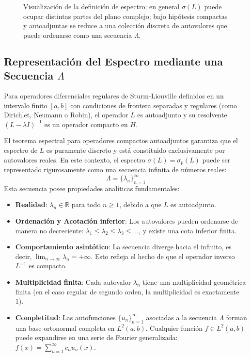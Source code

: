 \documentclass[a4paper]{article}
\begin{document}
\begin{figure}[H]
\begin{tikzpicture}[>=Latex,scale=0.9,
  box/.style={draw,rounded corners,thick,align=center,font=\small,inner sep=5pt},
  tag/.style={font=\scriptsize,align=center,fill=white,inner sep=1pt}]
\end{tikzpicture}
\caption{Visualización de la definición de espectro: en general $\sigma(L)$ puede ocupar distintas partes del plano complejo; bajo hipótesis compactas y autoadjuntas se reduce a una colección discreta de autovalores que puede ordenarse como una secuencia $\Lambda$.}
\end{figure}

\subsection*{Representación del Espectro mediante una Secuencia $\Lambda$}
Para operadores diferenciales regulares de Sturm-Liouville definidos en un intervalo finito $[a, b]$ con condiciones de frontera separadas y regulares (como Dirichlet, Neumann o Robin), el operador $L$ es autoadjunto y su resolvente $(L - \lambda I)^{-1}$ es un operador compacto en $H$. 

El teorema espectral para operadores compactos autoadjuntos garantiza que el espectro de $L$ es puramente discreto y está constituido exclusivamente por autovalores reales. En este contexto, el espectro $\sigma(L) = \sigma_p(L)$ puede ser representado rigurosamente como una secuencia infinita de números reales:
$$ \Lambda = \{\lambda_n\}_{n=1}^{\infty} $$
Esta secuencia posee propiedades analíticas fundamentales:
\begin{itemize}
    \item \textbf{Realidad}: $\lambda_n \in \mathbb{R}$ para todo $n \geq 1$, debido a que $L$ es autoadjunto.
    \item \textbf{Ordenación y Acotación inferior}: Los autovalores pueden ordenarse de manera no decreciente: $\lambda_1 \leq \lambda_2 \leq \lambda_3 \leq \dots$, y existe una cota inferior finita.
    \item \textbf{Comportamiento asintótico}: La secuencia diverge hacia el infinito, es decir, $\lim_{n \to \infty} \lambda_n = +\infty$. Esto refleja el hecho de que el operador inverso $L^{-1}$ es compacto.
    \item \textbf{Multiplicidad finita}: Cada autovalor $\lambda_n$ tiene una multiplicidad geométrica finita (en el caso regular de segundo orden, la multiplicidad es exactamente 1).
    \item \textbf{Completitud}: Las autofunciones $\{u_n\}_{n=1}^{\infty}$ asociadas a la secuencia $\Lambda$ forman una base ortonormal completa en $L^2(a, b)$. Cualquier función $f \in L^2(a, b)$ puede expandirse en una serie de Fourier generalizada: $f(x) = \sum_{n=1}^{\infty} c_n u_n(x)$.
\end{itemize}
\end{document}
